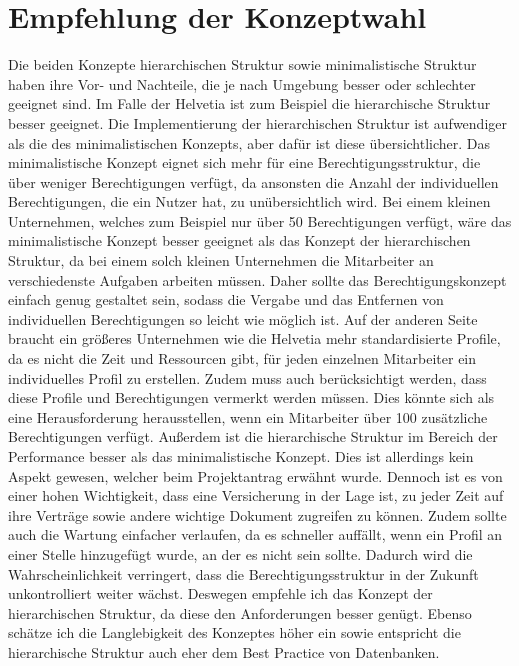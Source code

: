 \section{Empfehlung der Konzeptwahl}
\label{sec:chapter06}
Die beiden Konzepte hierarchischen Struktur sowie minimalistische Struktur haben ihre Vor- und Nachteile, die je nach Umgebung besser oder schlechter geeignet sind.
Im Falle der Helvetia ist zum Beispiel die hierarchische Struktur besser geeignet.
\newline
Die Implementierung der hierarchischen Struktur ist aufwendiger als die des minimalistischen Konzepts, aber dafür ist diese übersichtlicher.
Das minimalistische Konzept eignet sich mehr für eine Berechtigungsstruktur, die über weniger Berechtigungen verfügt, da ansonsten die Anzahl der individuellen Berechtigungen, die ein Nutzer hat, zu unübersichtlich wird.
Bei einem kleinen Unternehmen, welches zum Beispiel nur über 50 Berechtigungen verfügt, wäre das minimalistische Konzept besser geeignet als das Konzept der hierarchischen Struktur, da bei einem solch kleinen Unternehmen die Mitarbeiter an verschiedenste Aufgaben arbeiten müssen.
Daher sollte das Berechtigungskonzept einfach genug gestaltet sein, sodass die Vergabe und das Entfernen von individuellen Berechtigungen so leicht wie möglich ist.
Auf der anderen Seite braucht ein größeres Unternehmen wie die Helvetia mehr standardisierte Profile, da es nicht die Zeit und Ressourcen gibt, für jeden einzelnen Mitarbeiter ein individuelles Profil zu erstellen.
Zudem muss auch berücksichtigt werden, dass diese Profile und Berechtigungen vermerkt werden müssen.
Dies könnte sich als eine Herausforderung herausstellen, wenn ein Mitarbeiter über 100 zusätzliche Berechtigungen verfügt.
\newline
Außerdem ist die hierarchische Struktur im Bereich der Performance besser als das minimalistische Konzept.
Dies ist allerdings kein Aspekt gewesen, welcher beim Projektantrag erwähnt wurde.
Dennoch ist es von einer hohen Wichtigkeit, dass eine Versicherung in der Lage ist, zu jeder Zeit auf ihre Verträge sowie andere wichtige Dokument zugreifen zu können.
\newline
Zudem sollte auch die Wartung einfacher verlaufen, da es schneller auffällt, wenn ein Profil an einer Stelle hinzugefügt wurde, an der es nicht sein sollte.
Dadurch wird die Wahrscheinlichkeit verringert, dass die Berechtigungsstruktur in der Zukunft unkontrolliert weiter wächst.
Deswegen empfehle ich das Konzept der hierarchischen Struktur, da diese den Anforderungen besser genügt.
Ebenso schätze ich die Langlebigkeit des Konzeptes höher ein sowie entspricht die hierarchische Struktur auch eher dem Best Practice von Datenbanken.

